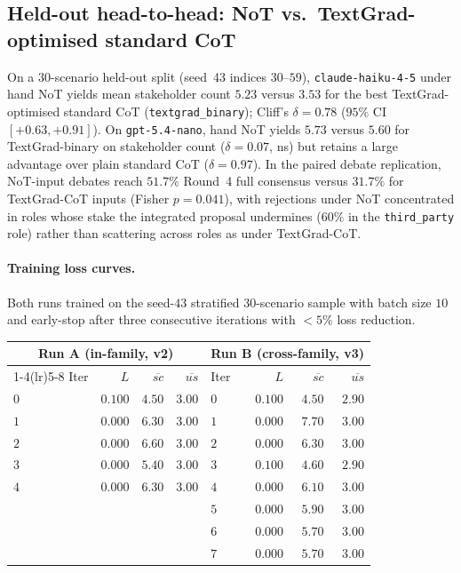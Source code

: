 \documentclass[11pt]{article}
\begin{document}
\subsection{Held-out head-to-head: NoT vs.\ TextGrad-optimised standard CoT}
\label{app:phase11}

On a 30-scenario held-out split (seed~43 indices $30$--$59$),
\texttt{claude-haiku-4-5} under hand NoT yields mean stakeholder count
$5.23$ versus $3.53$ for the best TextGrad-optimised standard CoT
(\texttt{textgrad\_binary}); Cliff's $\delta{=}0.78$ ($95\%$ CI
$[+0.63,+0.91]$). On \texttt{gpt-5.4-nano}, hand NoT yields
$5.73$ versus $5.60$ for TextGrad-binary on stakeholder count
($\delta{=}0.07$, ns) but retains a large advantage over plain
standard CoT ($\delta{=}0.97$). In the paired debate replication,
NoT-input debates reach $51.7\%$ Round~4 full consensus versus
$31.7\%$ for TextGrad-CoT inputs (Fisher $p{=}0.041$), with
rejections under NoT concentrated in roles whose stake the integrated
proposal undermines ($60\%$ in the \texttt{third\_party} role) rather
than scattering across roles as under TextGrad-CoT.

\paragraph{Training loss curves.} Both runs trained on the seed-$43$
stratified $30$-scenario sample with batch size $10$ and early-stop
after three consecutive iterations with $< 5\%$ loss reduction.

\begin{center}\small\setlength{\tabcolsep}{4pt}
\begin{tabular}{lrrr@{\hskip 1em}lrrr}
\toprule
\multicolumn{4}{c}{\textbf{Run A (in-family, v2)}} & \multicolumn{4}{c}{\textbf{Run B (cross-family, v3)}} \\
\cmidrule(lr){1-4}\cmidrule(lr){5-8}
Iter & $L$ & $\overline{\mathit{sc}}$ & $\overline{\mathit{us}}$ & Iter & $L$ & $\overline{\mathit{sc}}$ & $\overline{\mathit{us}}$ \\
\midrule
$0$ & $0.100$ & $4.50$ & $3.00$ & $0$ & $0.100$ & $4.50$ & $2.90$ \\
$1$ & $0.000$ & $6.30$ & $3.00$ & $1$ & $0.000$ & $7.70$ & $3.00$ \\
$2$ & $0.000$ & $6.60$ & $3.00$ & $2$ & $0.000$ & $6.30$ & $3.00$ \\
$3$ & $0.000$ & $5.40$ & $3.00$ & $3$ & $0.100$ & $4.60$ & $2.90$ \\
$4$ & $0.000$ & $6.30$ & $3.00$ & $4$ & $0.000$ & $6.10$ & $3.00$ \\
    &         &        &        & $5$ & $0.000$ & $5.90$ & $3.00$ \\
    &         &        &        & $6$ & $0.000$ & $5.70$ & $3.00$ \\
    &         &        &        & $7$ & $0.000$ & $5.70$ & $3.00$ \\
\bottomrule
\end{tabular}
\end{center}
\end{document}
